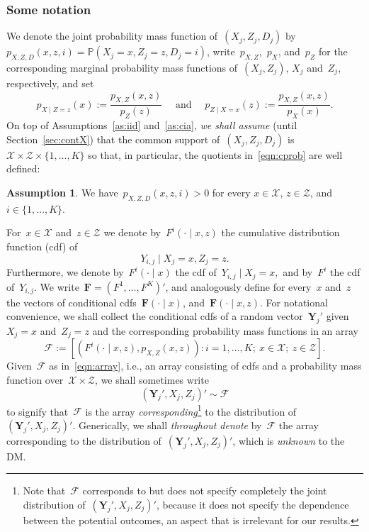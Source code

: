 \documentclass[11pt, a4paper]{article}
\theoremstyle{definition}
\newtheorem{assumption}{Assumption}[section]
\begin{document}
\subsubsection{Some notation}\label{ssec:notation}

We denote the joint probability mass function of~$(X_j, Z_j, D_j)$ by~$p_{X, Z, D}(x, z, i) = \mathbb{P}(X_j = x, Z_j = z, D_j = i)$, write~$p_{X, Z}$,~$p_X$, and~$p_Z$ for the corresponding marginal probability mass functions of~$(X_j, Z_j)$, $X_j$ and~$Z_j$, respectively, and set
\begin{equation}\label{eqn:cprob}
p_{X \mid Z = z}(x) := \frac{p_{X, Z}(x, z)}{p_Z(z)} \quad \text{ and } \quad p_{Z \mid X = x}(z) := \frac{p_{X, Z}(x, z)}{p_X(x)}.
\end{equation}
%
On top of Assumptions~\ref{as:iid} and~\ref{as:cia}, \emph{we shall assume} (until Section~\ref{sec:contX}) that the common support of~$(X_j, Z_j, D_j)$ is~$\mathcal{X} \times \mathcal{Z} \times \{1, \hdots, K\}$ so that, in particular, the quotients in~\eqref{eqn:cprob} are well defined:
\begin{assumption}\label{as:posprob}
We have~$p_{X, Z, D}(x, z, i) > 0$ for every $x \in \mathcal{X}$, $z \in \mathcal{Z}$, and $i \in \{1, \hdots, K\}$.
\end{assumption}
%
For~$x \in \mathcal{X}$ and~$z \in \mathcal{Z}$ we denote by~$F^{i}(\cdot \mid x, z)$ the cumulative distribution function (cdf) of~$$Y_{i, j} \mid X_j = x, Z_j = z.$$ Furthermore, we denote by~$F^i(\cdot \mid x)$ the cdf of~$Y_{i, j} \mid X_j = x,$ and by~$F^i$ the cdf of~$Y_{i, j}$. We write~$\bm{F} = (F^1, \hdots, F^K)'$, and analogously define for every~$x$ and~$z$ the vectors of conditional cdfs~$\bm{F}(\cdot \mid x)$, and~$\bm{F}(\cdot\mid x, z)$. For notational convenience, we shall collect the conditional cdfs of a random vector~$\bm{Y}_j'$ given~$X_j = x$ and~$Z_j = z$ and the corresponding probability mass functions in an array 
\begin{equation}\label{eqn:array}
\mathcal{F} := \left[(F^i(\cdot\mid x, z), p_{X, Z}(x, z)): i = 1, \hdots, K;~x \in \mathcal{X};~z \in \mathcal{Z}\right].
\end{equation}
%
Given~$\mathcal{F}$ as in~\eqref{eqn:array}, i.e., an array consisting of cdfs and a probability mass function over~$\mathcal{X} \times \mathcal{Z}$, we shall sometimes write~$$(\bm{Y}_j', X_j, Z_j)' \sim \mathcal{F}$$ to signify that~$\mathcal{F}$ is the array \emph{corresponding}\footnote{Note that~$\mathcal{F}$ corresponds to but does not specify completely the joint distribution of~$(\bm{Y}_j', X_j, Z_j)'$, because it does not specify the dependence between the potential outcomes, an aspect that is irrelevant for our results.} to the distribution of~$(\bm{Y}_j', X_j, Z_j)'$. Generically, we shall \emph{throughout denote} by~$\mathcal{F}$ the array corresponding to the distribution of~$(\bm{Y}_j', X_j, Z_j)'$, which is \emph{unknown} to the DM. 
\end{document}
